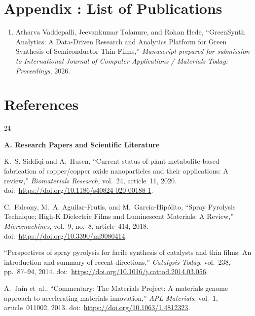 \documentclass[12pt,a4paper,oneside]{report}
\begin{document}
{{{\chapter{Appendix : List of Publications}

\begin{enumerate}
    \item Atharva Vaddepalli, Jeevankumar Tolanure, and Rohan Hede, ``GreenSynth Analytics: A Data-Driven Research and Analytics Platform for Green Synthesis of Semiconductor Thin Films,'' \textit{Manuscript prepared for submission to International Journal of Computer Applications / Materials Today: Proceedings}, 2026.
\end{enumerate}
\chapter{References}

\begingroup
\renewcommand{\chapter}[2]{}
\begin{thebibliography}{24}

\item[] \vspace{0.1cm}\hspace{-\leftmargin}\textbf{\large A. Research Papers and Scientific Literature}\vspace{0.2cm}

K.~S. Siddiqi and A.~Husen, ``Current status of plant metabolite-based fabrication of copper/copper oxide nanoparticles and their applications: A review,'' \textit{Biomaterials Research}, vol.~24, article~11, 2020. doi:~\url{https://doi.org/10.1186/s40824-020-00188-1}.

C.~Falcony, M.~A. Aguilar-Frutis, and M.~Garc{\'i}a-Hip{\'o}lito, ``Spray Pyrolysis Technique; High-K Dielectric Films and Luminescent Materials: A Review,'' \textit{Micromachines}, vol.~9, no.~8, article~414, 2018. doi:~\url{https://doi.org/10.3390/mi9080414}.

``Perspectives of spray pyrolysis for facile synthesis of catalysts and thin films: An introduction and summary of recent directions,'' \textit{Catalysis Today}, vol.~238, pp.~87--94, 2014. doi:~\url{https://doi.org/10.1016/j.cattod.2014.03.056}.

A.~Jain et~al., ``Commentary: The Materials Project: A materials genome approach to accelerating materials innovation,'' \textit{APL Materials}, vol.~1, article~011002, 2013. doi:~\url{https://doi.org/10.1063/1.4812323}.


\end{thebibliography}}}}
\end{document}
